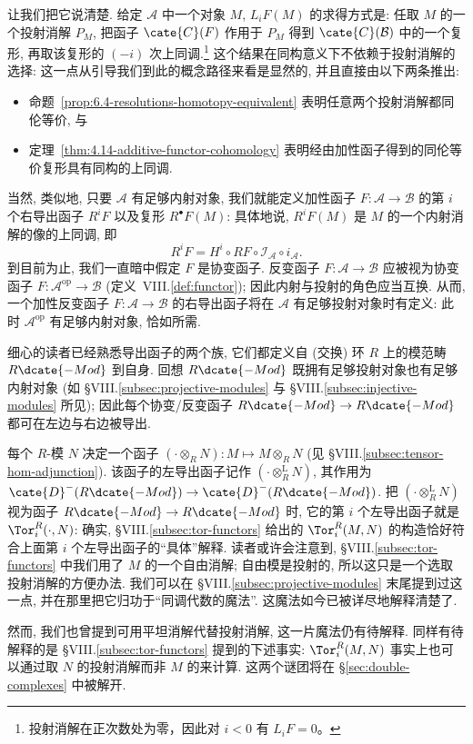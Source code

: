 让我们把它说清楚. 给定 $\mathcal{A}$ 中一个对象 $M$, $L_i F(M)$ 的求得方式是: 任取 $M$ 的一个投射消解 $P_M$, 把函子 $\cate{C}(F)$ 作用于 $P_M$ 得到 $\cate{C}(\mathcal{B})$ 中的一个复形, 再取该复形的 $(-i)$ 次上同调.\footnote{投射消解在正次数处为零，因此对 $i<0$ 有 $L_iF=0$。} 这个结果在同构意义下不依赖于投射消解的选择: 这一点从引导我们到此的概念路径来看是显然的, 并且直接由以下两条推出:
\begin{itemize}
\item 命题~\ref{prop:6.4-resolutions-homotopy-equivalent} 表明任意两个投射消解都同伦等价, 与
\item 定理~\ref{thm:4.14-additive-functor-cohomology} 表明经由加性函子得到的同伦等价复形具有同构的上同调.
\end{itemize}
当然, 类似地, 只要 $\mathcal{A}$ 有足够内射对象, 我们就能定义加性函子 $F:\mathcal{A}\to\mathcal{B}$ 的第 $i$ 个右导出函子 $R^i F$ 以及复形 $R^\bullet F(M)$: 具体地说, $R^i F(M)$ 是 $M$ 的一个内射消解的像的上同调, 即
\[
R^i F = H^i\circ R F\circ\mathcal{I}_{\mathcal{A}}\circ i_{\mathcal{A}}.
\]
到目前为止, 我们一直暗中假定 $F$ 是协变函子. 反变函子 $F:\mathcal{A}\to\mathcal{B}$ 应被视为协变函子 $F:\mathcal{A}^{\mathrm{op}}\to\mathcal{B}$ (定义~VIII.\ref{def:functor}); 因此内射与投射的角色应当互换. 从而, 一个加性反变函子 $F:\mathcal{A}\to\mathcal{B}$ 的右导出函子将在 $\mathcal{A}$ 有足够投射对象时有定义: 此时 $\mathcal{A}^{\mathrm{op}}$ 有足够内射对象, 恰如所需.

细心的读者已经熟悉导出函子的两个族, 它们都定义自 (交换) 环 $R$ 上的模范畴 $R\dcate{-Mod}$ 到自身. 回想 $R\dcate{-Mod}$ 既拥有足够投射对象也有足够内射对象 (如 §VIII.\ref{subsec:projective-modules} 与 §VIII.\ref{subsec:injective-modules} 所见); 因此每个协变/反变函子 $R\dcate{-Mod}\to R\dcate{-Mod}$ 都可在左边与右边被导出.

\begin{example}\label{ex:7.6-tor}
每个 $R$-模 $N$ 决定一个函子 $(\cdot\otimes_R N):M\mapsto M\otimes_R N$ (见 §VIII.\ref{subsec:tensor-hom-adjunction}). 该函子的左导出函子记作 $(\cdot\otimes_R^{\mathrm{L}} N)$, 其作用为 $\cate{D}^-(R\dcate{-Mod})\to\cate{D}^-(R\dcate{-Mod})$. 把 $(\cdot\otimes_R^{\mathrm{L}} N)$ 视为函子 $R\dcate{-Mod}\to R\dcate{-Mod}$ 时, 它的第 $i$ 个左导出函子就是 $\Tor_i^R(\cdot,N)$: 确实, §VIII.\ref{subsec:tor-functors} 给出的 $\Tor_i^R(M,N)$ 的构造恰好符合上面第 $i$ 个左导出函子的``具体''解释. 读者或许会注意到, §VIII.\ref{subsec:tor-functors} 中我们用了 $M$ 的一个自由消解; 自由模是投射的, 所以这只是一个选取投射消解的方便办法. 我们可以在 §VIII.\ref{subsec:projective-modules} 末尾提到过这一点, 并在那里把它归功于``同调代数的魔法''. 这魔法如今已被详尽地解释清楚了.

然而, 我们也曾提到可用平坦消解代替投射消解, 这一片魔法仍有待解释. 同样有待解释的是 §VIII.\ref{subsec:tor-functors} 提到的下述事实: $\Tor_i^R(M,N)$ 事实上也可以通过取 $N$ 的投射消解而非 $M$ 的来计算. 这两个谜团将在 \S\ref{sec:double-complexes} 中被解开.
\end{example}

